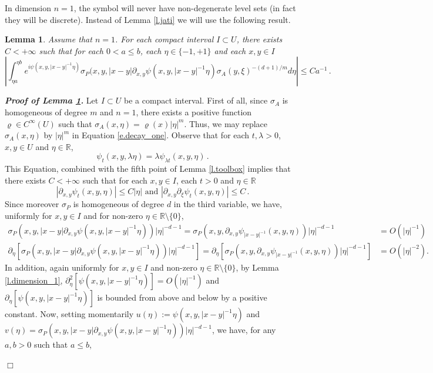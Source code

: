 \documentclass[10pt,twoside]{article}
\newcommand{\R}{\mathbb{R}}
\newenvironment{prf}[1][]
{\vskip 2mm  {\it \bf Proof#1. }}{$\Box$ \vskip 2mm}
\numberwithin{theorem}{section}
\newtheorem{lemma}[theorem]{Lemma}
\begin{document}
In dimension $n=1$, the symbol will never have non-degenerate level sets (in fact they will be discrete). Instead of Lemma \ref{l.jati} we will use the following result.

\begin{lemma}\label{l.decay_one}
Assume that $n=1$. For each compact interval $I\subset U$, there exists $C<+\infty$ such that for each $0<a\leq b$, each $\eta\in\{-1,+1\}$ and each $x,y\in I$
 \begin{equation}\label{e.decay_one}
 \left|\int_{\eta a}^{\eta b}e^{i\psi(x,y,|x-y|^{-1}\eta)}\sigma_P(x,y,|x-y|\partial_{x,y}\psi(x,y,|x-y|^{-1}\eta)\sigma_A(y,\xi)^{-(d+1)/m}d\eta\right|\leq Ca^{-1}\, .
 \end{equation} 
\end{lemma}

\begin{prf}[ of Lemma \ref{l.decay_one}]
Let $I\subset U$ be a compact interval. First of all, since $\sigma_A$ is homogeneous of degree $m$ and $n=1$, there exists a positive function $\varrho\in C^\infty(U)$ such that $\sigma_A(x,\eta)=\varrho(x)|\eta|^m$. Thus, we may replace $\sigma_A(x,\eta)$ by $|\eta|^m$ in Equation \eqref{e.decay_one}. Observe that for each $t,\lambda>0$, $x,y\in U$ and $\eta\in \R$,
\[
\psi_t(x,y,\lambda\eta) = \lambda\psi_{\lambda t}(x,y,\eta)\, .
\]
This Equation, combined with the fifth point of Lemma \ref{l.toolbox} implies that there exists $C<+\infty$ such that for each $x,y\in I$, each $t>0$ and $\eta\in\R$
\[
\left|\partial_{x,y}\psi_t(x,y,\eta)\right|\leq C|\eta|\text{ and } \left|\partial_{x,y}\partial_\xi\psi_t(x,y,\eta)\right|\leq C\, .
\]
Since moreover $\sigma_P$ is homogeneous of degree $d$ in the third variable, we have, uniformly for $x,y\in I$ and for non-zero $\eta\in\R\setminus\{0\}$,
  \begin{align*}
    \sigma_P(x,y,|x-y|\partial_{x,y}\psi(x,y,|x-y|^{-1}\eta))|\eta|^{-d-1}= \sigma_P(x,y,\partial_{x,y}\psi_{|x-y|^{-1}}(x,y,\eta))|\eta|^{-d-1}&=O(|\eta|^{-1})\\
    \partial_\eta[\sigma_P(x,y,|x-y|\partial_{x,y}\psi(x,y,|x-y|^{-1}\eta))|\eta|^{-d-1}]=\partial_\eta[\sigma_P(x,y,\partial_{x,y}\psi_{|x-y|^{-1}}(x,y,\eta))|\eta|^{-d-1}]&=O(|\eta|^{-2}).
  \end{align*}  
  In addition, again uniformly for $x,y\in I$ and non-zero $\eta\in\R\setminus\{0\}$, by Lemma \ref{l.dimension_1}, $\partial_\eta^2[\psi(x,y,|x-y|^{-1}\eta)]=O(|\eta|^{-1})$ and $\partial_\eta[\psi(x,y,|x-y|^{-1}\eta)]$ is bounded from above and below by a positive constant. Now, setting momentarily $u(\eta):=\psi(x,y,|x-y|^{-1}\eta)$ and $v(\eta)=\sigma_P(x,y,|x-y|\partial_{x,y}\psi(x,y,|x-y|^{-1}\eta))|\eta|^{-d-1}$, we have, for any $a,b>0$ such that $a\leq b$,

\end{prf}
\end{document}
